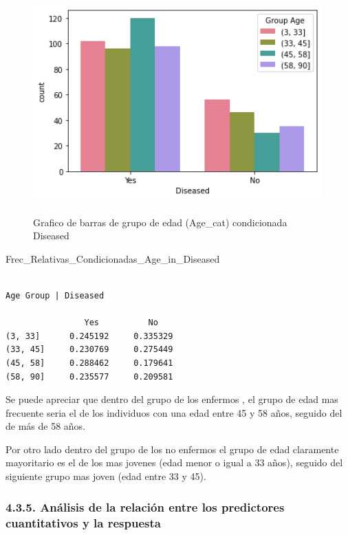 \documentclass[
  11pt,
  a4paper,
]{article}
\newenvironment{Shaded}{\begin{snugshade}}{\end{snugshade}}
\newcommand{\NormalTok}[1]{#1}
\begin{document}
\begin{figure}
\centering
\includegraphics[width=4.375in,height=3.33333in]{output_195_1.png}
\caption{Grafico de barras de grupo de edad (Age\_cat) condicionada
Diseased}
\end{figure}

\begin{Shaded}
\begin{Highlighting}[]
\NormalTok{Frec\_Relativas\_Condicionadas\_Age\_in\_Diseased}
\end{Highlighting}
\end{Shaded}

\begin{verbatim}

Age Group | Diseased

                Yes          No
(3, 33]      0.245192     0.335329
(33, 45]     0.230769     0.275449
(45, 58]     0.288462     0.179641
(58, 90]     0.235577     0.209581
\end{verbatim}

Se puede apreciar que dentro del grupo de los enfermos , el grupo de
edad mas frecuente seria el de los individuos con una edad entre 45 y 58
años, seguido del de más de 58 años.

Por otro lado dentro del grupo de los no enfermos el grupo de edad
claramente mayoritario es el de los mas jovenes (edad menor o igual a 33
años), seguido del siguiente grupo mas joven (edad entre 33 y 45).

\vspace{1cm}

\hypertarget{anuxe1lisis-de-la-relaciuxf3n-entre-los-predictores-cuantitativos-y-la-respuesta}{%
\subsubsection{\texorpdfstring{4.3.5. Análisis de la relación entre los
predictores cuantitativos y la respuesta
}{4.3.5. Análisis de la relación entre los predictores cuantitativos y la respuesta }}\label{anuxe1lisis-de-la-relaciuxf3n-entre-los-predictores-cuantitativos-y-la-respuesta}}
\end{document}
